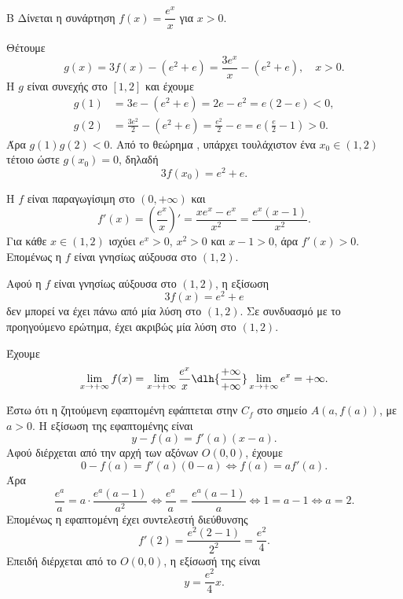 \begin{thema}{Β}
Δίνεται η συνάρτηση $f(x) = \dfrac{e^x}{x}$ για $x > 0$.
\begin{erwthma}
\item Θέτουμε
\[
g(x)=3f(x)-(e^2+e)=\frac{3e^x}{x}-(e^2+e), \quad x>0.
\]
Η $g$ είναι συνεχής στο $[1,2]$ και έχουμε
\begin{align*}
g(1)&=3e-(e^2+e)=2e-e^2=e(2-e)<0,\\
g(2)&=\frac{3e^2}{2}-(e^2+e)=\frac{e^2}{2}-e=e\left(\frac{e}{2}-1\right)>0.
\end{align*}
Άρα $g(1)g(2)<0$. Από το θεώρημα , υπάρχει τουλάχιστον ένα
$x_0\in(1,2)$ τέτοιο ώστε $g(x_0)=0$, δηλαδή
\[
3f(x_0)=e^2+e.
\]

\item Η $f$ είναι παραγωγίσιμη στο $(0,+\infty)$ και
\[
f'(x)=\left(\frac{e^x}{x}\right)'=\frac{xe^x-e^x}{x^2}=\frac{e^x(x-1)}{x^2}.
\]
Για κάθε $x\in(1,2)$ ισχύει $e^x>0$, $x^2>0$ και $x-1>0$, άρα $f'(x)>0$.
Επομένως η $f$ είναι γνησίως αύξουσα στο $(1,2)$.

Αφού η $f$ είναι γνησίως αύξουσα στο $(1,2)$, η εξίσωση
\[
3f(x)=e^2+e
\]
δεν μπορεί να έχει πάνω από μία λύση στο $(1,2)$. Σε συνδυασμό με το προηγούμενο
ερώτημα, έχει ακριβώς μία λύση στο $(1,2)$.

\item Έχουμε
\[
\lim_{x\to+\infty}f(x)=\lim_{x\to+\infty}\frac{e^x}{x}
\dlh{\frac{+\infty}{+\infty}}
\lim_{x\to+\infty}e^x=+\infty.
\]

\item Έστω ότι η ζητούμενη εφαπτομένη εφάπτεται στην $C_f$ στο σημείο
$A(a,f(a))$, με $a>0$. Η εξίσωση της εφαπτομένης είναι
\[
y-f(a)=f'(a)(x-a).
\]
Αφού διέρχεται από την αρχή των αξόνων $O(0,0)$, έχουμε
\[
0-f(a)=f'(a)(0-a)\Leftrightarrow f(a)=af'(a).
\]
Άρα
\[
\frac{e^a}{a}=a\cdot \frac{e^a(a-1)}{a^2}
\Leftrightarrow \frac{e^a}{a}=\frac{e^a(a-1)}{a}
\Leftrightarrow 1=a-1
\Leftrightarrow a=2.
\]
Επομένως η εφαπτομένη έχει συντελεστή διεύθυνσης
\[
f'(2)=\frac{e^2(2-1)}{2^2}=\frac{e^2}{4}.
\]
Επειδή διέρχεται από το $O(0,0)$, η εξίσωσή της είναι
\[
y=\frac{e^2}{4}x.
\]
\end{erwthma}
\end{thema}
